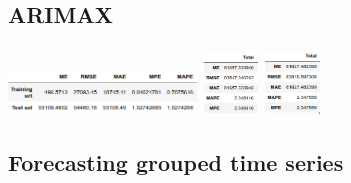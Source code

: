 \documentclass[c, dvipsnames]{beamer}  %
\begin{document}
\subsection{ARIMAX}


\begin{frame}[shrink=5]
\frametitle{\insertsection} 
\framesubtitle{\insertsubsection}



%
%

\hfil\hfil\includegraphics[width=5cm]{screenshot041}\hfil\hfil
\includegraphics[width=1.5cm]{screenshot036}\hfil\hfil
\includegraphics[width=1.5cm]{screenshot042}\newline


\end{frame}







\subsection{Forecasting 	grouped time series}
\end{document}
